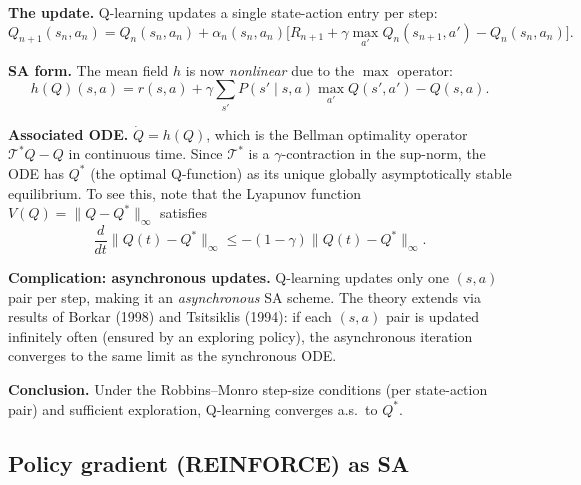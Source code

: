 \documentclass[11pt,a4paper]{article}
\theoremstyle{definition}
\theoremstyle{plain}
\theoremstyle{remark}
\begin{document}
\begin{rlconnection}
\textbf{The update.} Q-learning updates a single state-action entry per step:
\[
  Q_{n+1}(s_n, a_n) = Q_n(s_n, a_n) + \alpha_n(s_n, a_n)
    \bigl[R_{n+1} + \gamma \max_{a'} Q_n(s_{n+1}, a') - Q_n(s_n, a_n)\bigr].
\]

\textbf{SA form.} The mean field $h$ is now \emph{nonlinear} due to the $\max$ operator:
\[
  h(Q)(s,a) = r(s,a) + \gamma \sum_{s'} P(s' \mid s, a) \max_{a'} Q(s', a') - Q(s,a).
\]

\textbf{Associated ODE.} $\dot{Q} = h(Q)$, which is the Bellman optimality operator
$\mathcal{T}^* Q - Q$ in continuous time. Since $\mathcal{T}^*$ is a
$\gamma$-contraction in the sup-norm, the ODE has $Q^*$ (the optimal Q-function) as
its unique globally asymptotically stable equilibrium. To see this, note that the
Lyapunov function $V(Q) = \|Q - Q^*\|_\infty$ satisfies
\[
  \frac{d}{dt}\|Q(t) - Q^*\|_\infty \leq -(1 - \gamma)\|Q(t) - Q^*\|_\infty.
\]

\textbf{Complication: asynchronous updates.} Q-learning updates only one $(s,a)$ pair
per step, making it an \emph{asynchronous} SA scheme. The theory extends via results
of Borkar (1998) and Tsitsiklis (1994): if each $(s,a)$ pair is updated infinitely
often (ensured by an exploring policy), the asynchronous iteration converges to the
same limit as the synchronous ODE.

\textbf{Conclusion.} Under the Robbins--Monro step-size conditions (per state-action
pair) and sufficient exploration, Q-learning converges a.s.\ to $Q^*$.
\end{rlconnection}

\subsection{Policy gradient (REINFORCE) as SA}
\end{document}
